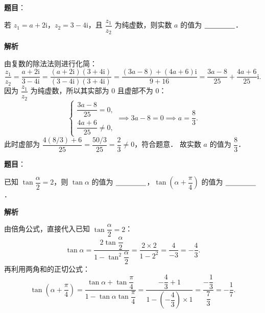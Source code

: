 \begin{answer}

\textbf{题目}：

若 $z_1 = a + 2\mathrm{i}$，$z_2 = 3 - 4\mathrm{i}$，且 $\dfrac{z_1}{z_2}$ 为纯虚数，则实数 $a$ 的值为 $\underline{\hspace{1.5cm}}$．

\textbf{解析}

由复数的除法法则进行化简：
\nopagebreak[4]
\[
\frac{z_1}{z_2} = \frac{a + 2\mathrm{i}}{3 - 4\mathrm{i}} = \frac{(a + 2\mathrm{i})(3 + 4\mathrm{i})}{(3 - 4\mathrm{i})(3 + 4\mathrm{i})} = \frac{(3a - 8) + (4a + 6)\mathrm{i}}{9 + 16} = \frac{3a - 8}{25} + \frac{4a + 6}{25}\mathrm{i}.
\]
因为 $\dfrac{z_1}{z_2}$ 为纯虚数，所以其实部为 0 且虚部不为 0：
\nopagebreak[4]
\[
\begin{cases}
\dfrac{3a - 8}{25} = 0, \\[6pt]
\dfrac{4a + 6}{25} \neq 0,
\end{cases}
\implies 3a - 8 = 0 \implies a = \frac{8}{3}.
\]
此时虚部为 $\dfrac{4(8/3) + 6}{25} = \dfrac{50/3}{25} = \dfrac{2}{3} \neq 0$，符合题意．
故实数 $a$ 的值为 $\dfrac{8}{3}$．


\end{answer}
\begin{answer}

\textbf{题目}：

已知 $\tan\dfrac{\alpha}{2} = 2$，则 $\tan\alpha$ 的值为 $\underline{\hspace{1.5cm}}$，$\tan\left(\alpha + \dfrac{\pi}{4}\right)$ 的值为 $\underline{\hspace{1.5cm}}$．

\textbf{解析}

由倍角公式，直接代入已知 $\tan\dfrac{\alpha}{2} = 2$：
\nopagebreak[4]
\[
\tan\alpha = \frac{2\tan\dfrac{\alpha}{2}}{1 - \tan^2\dfrac{\alpha}{2}} = \frac{2 \times 2}{1 - 2^2} = \frac{4}{-3} = -\frac{4}{3}.
\]
再利用两角和的正切公式：
\nopagebreak[4]
\[
\tan\left(\alpha + \frac{\pi}{4}\right) = \frac{\tan\alpha + \tan\dfrac{\pi}{4}}{1 - \tan\alpha\tan\dfrac{\pi}{4}} = \frac{-\dfrac{4}{3} + 1}{1 - \left(-\dfrac{4}{3}\right) \times 1} = \frac{-\dfrac{1}{3}}{\dfrac{7}{3}} = -\frac{1}{7}.
\]


\end{answer}
